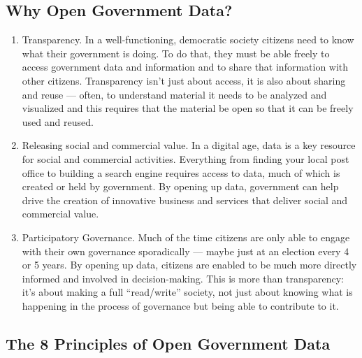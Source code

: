 \documentclass[12pt]{article}
\begin{document}
\subsection{Why Open Government Data?}
\begin{enumerate}
\item Transparency. In a well-functioning, democratic society citizens need to know what their government is doing. To do that, they must be able freely to access government data and information and to share that information with other citizens. Transparency isn’t just about access, it is also about sharing and reuse — often, to understand material it needs to be analyzed and visualized and this requires that the material be open so that it can be freely used and reused.
\item Releasing social and commercial value. In a digital age, data is a key resource for social and commercial activities. Everything from finding your local post office to building a search engine requires access to data, much of which is created or held by government. By opening up data, government can help drive the creation of innovative business and services that deliver social and commercial value.
\item Participatory Governance. Much of the time citizens are only able to engage with their own governance sporadically — maybe just at an election every 4 or 5 years. By opening up data, citizens are enabled to be much more directly informed and involved in decision-making. This is more than transparency: it’s about making a full “read/write” society, not just about knowing what is happening in the process of governance but being able to contribute to it.
\end{enumerate}

\subsection{The 8 Principles of Open Government Data}
\end{document}
